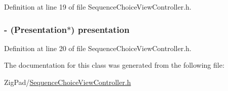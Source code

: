 Definition at line 19 of file SequenceChoiceViewController.h.

\hypertarget{interface_sequence_choice_view_controller_a4687fd0668ba32c76160e4d4f1747c12}{
\subsubsection[{presentation}]{\setlength{\rightskip}{0pt plus 5cm}-\/ ({\bf Presentation}$\ast$) presentation}}
\label{interface_sequence_choice_view_controller_a4687fd0668ba32c76160e4d4f1747c12}


Definition at line 20 of file SequenceChoiceViewController.h.



The documentation for this class was generated from the following file:\begin{DoxyCompactItemize}
\item 
ZigPad/\hyperlink{_sequence_choice_view_controller_8h}{SequenceChoiceViewController.h}\end{DoxyCompactItemize}
